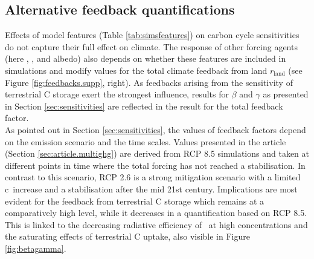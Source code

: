 \subsection{Alternative feedback quantifications}
\label{sec:alt.feedb}
Effects of model features (Table \ref{tab:simsfeatures}) on carbon cycle sensitivities do not capture their full effect on climate. The response of other forcing agents (here \nno , \chh , and albedo) also depends on whether these features are included in simulations and modify values for the total climate feedback from land $r_{\text{land}}$ (see Figure \ref{fig:feedbacks.supp}, right). As feedbacks arising from the sensitivity of terrestrial C storage exert the strongest influence, results for $\beta$ and $\gamma$ as presented in Section \ref{sec:sensitivities} are reflected in the result for the total feedback factor.\\

As pointed out in Section \ref{sec:sensitivities}, the values of feedback factors depend on the emission scenario and the time scales. Values presented in the article (Section \ref{sec:article.multighg}) are derived from RCP 8.5 simulations and taken at different points in time where the total forcing has not reached a stabilisation. In contrast to this scenario, RCP 2.6 is a strong mitigation scenario with a limited c\coo\ increase and a stabilisation after the mid 21st century. Implications are most evident for the feedback from terrestrial C storage which remains at a comparatively high level, while it decreases in a quantification based on RCP 8.5. This is linked to the decreasing radiative efficiency of \coo\ at high concentrations and the saturating effects of terrestrial C uptake, also visible in Figure \ref{fig:betagamma}. 

